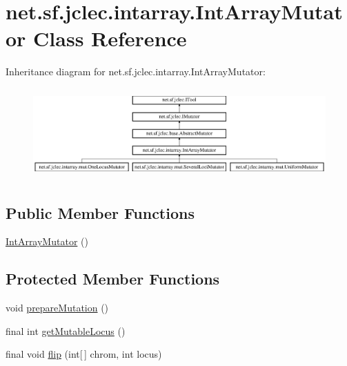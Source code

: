 \hypertarget{classnet_1_1sf_1_1jclec_1_1intarray_1_1_int_array_mutator}{\section{net.\-sf.\-jclec.\-intarray.\-Int\-Array\-Mutator Class Reference}
\label{classnet_1_1sf_1_1jclec_1_1intarray_1_1_int_array_mutator}
}
Inheritance diagram for net.\-sf.\-jclec.\-intarray.\-Int\-Array\-Mutator\-:\begin{figure}[H]
\begin{center}
\leavevmode
\includegraphics[height=3.482587cm]{classnet_1_1sf_1_1jclec_1_1intarray_1_1_int_array_mutator}
\end{center}
\end{figure}
\subsection*{Public Member Functions}
\begin{DoxyCompactItemize}
\item 
\hyperlink{classnet_1_1sf_1_1jclec_1_1intarray_1_1_int_array_mutator_ac98b42b651a36a423812c434ab539b3f}{Int\-Array\-Mutator} ()
\end{DoxyCompactItemize}
\subsection*{Protected Member Functions}
\begin{DoxyCompactItemize}
\item 
void \hyperlink{classnet_1_1sf_1_1jclec_1_1intarray_1_1_int_array_mutator_a088c3c1163c64a669a623c949843cd15}{prepare\-Mutation} ()
\item 
final int \hyperlink{classnet_1_1sf_1_1jclec_1_1intarray_1_1_int_array_mutator_ab87e6e9e59260a4bc68beec7549cc0f5}{get\-Mutable\-Locus} ()
\item 
final void \hyperlink{classnet_1_1sf_1_1jclec_1_1intarray_1_1_int_array_mutator_a9946215a7fda80cdd7d9c1adc6221949}{flip} (int\mbox{[}$\,$\mbox{]} chrom, int locus)
\end{DoxyCompactItemize}
